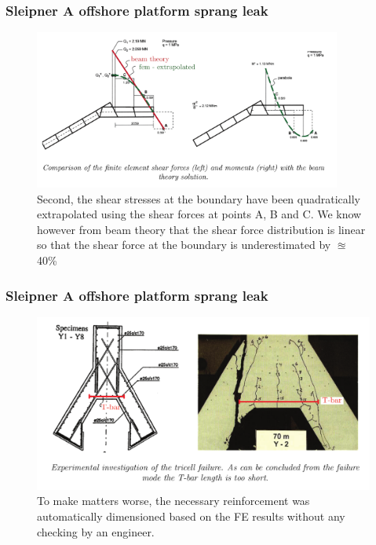 \documentclass[handout]{beamer}
\begin{document}
\begin{frame}
\frametitle{Sleipner A offshore platform sprang leak}
\begin{figure}
	\centering
	\includegraphics[width=0.9\textwidth]{figs/sleipner-shear.png}
	\caption*{Second, the shear stresses at the boundary have been quadratically extrapolated using the shear forces at points A, B and C. We know however from beam theory that the shear force distribution is linear so that the shear force at the boundary is underestimated by $\approxeq$ 40\%}
\end{figure}
\end{frame}

\begin{frame}
\frametitle{Sleipner A offshore platform sprang leak}
\begin{figure}
	\centering
	\includegraphics[width=\textwidth]{figs/sleipner-reinforcement.png}
	\caption*{To make matters worse, the necessary reinforcement was automatically 
		dimensioned based on the FE results without any checking by an engineer.}
\end{figure}
\end{frame}
\end{document}
